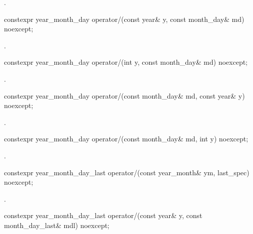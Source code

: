 \begin{itemdescr}
\pnum
\returns
{}.
\end{itemdescr}

\begin{itemdecl}
constexpr year_month_day
  operator/(const year& y, const month_day& md) noexcept;
\end{itemdecl}

\begin{itemdescr}
\pnum
\returns
{}.
\end{itemdescr}

\begin{itemdecl}
constexpr year_month_day
  operator/(int y, const month_day& md) noexcept;
\end{itemdecl}

\begin{itemdescr}
\pnum
\returns
{}.
\end{itemdescr}

\begin{itemdecl}
constexpr year_month_day
  operator/(const month_day& md, const year& y) noexcept;
\end{itemdecl}

\begin{itemdescr}
\pnum
\returns
{}.
\end{itemdescr}

\begin{itemdecl}
constexpr year_month_day
  operator/(const month_day& md, int y) noexcept;
\end{itemdecl}

\begin{itemdescr}
\pnum
\returns
{}.
\end{itemdescr}

\begin{itemdecl}
constexpr year_month_day_last
  operator/(const year_month& ym, last_spec) noexcept;
\end{itemdecl}

\begin{itemdescr}
\pnum
\returns
{}.
\end{itemdescr}

\begin{itemdecl}
constexpr year_month_day_last
  operator/(const year& y, const month_day_last& mdl) noexcept;
\end{itemdecl}


